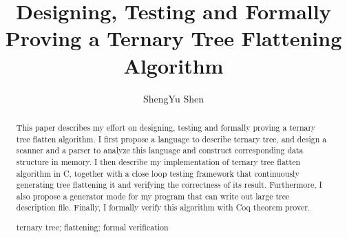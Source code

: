 \documentclass[runningheads,a4paper]{llncs}
\newcommand{\keywords}[1]{\par\addvspace\baselineskip
\noindent\keywordname\enspace\ignorespaces#1}
\begin{document}


\mainmatter  %

\title{Designing, Testing and Formally Proving a Ternary Tree Flattening Algorithm}


%
%
\author{ShengYu Shen%
}
%

\institute{
\mailsa\\
}

%
%

\maketitle


\begin{abstract}
This paper describes my effort on designing, 
testing and formally proving a ternary tree flatten algorithm.
I first propose a language to describe ternary tree,
and design a scanner and a parser to analyze this language
and construct corresponding data structure in memory.
I then describe my implementation of ternary tree flatten algorithm in C,
together with a close loop testing framework that continuously generating tree
flattening it and verifying the correctness of its result.
Furthermore,
I also propose a generator mode for my program that can write out 
large tree description file.
Finally,
I formally verify this algorithm with Coq theorem prover.
\keywords{ternary tree; flattening; formal verification}
\end{abstract}
\end{document}
